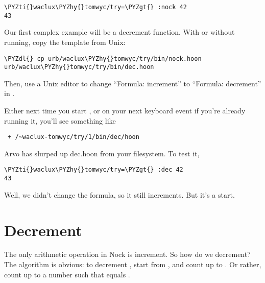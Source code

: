 \begin{framed_shaded}
\begin{Verbatim}[fontsize=\relsize{-2.5},fontseries=b,commandchars=\\\{\}]
\PYZti{}waclux\PYZhy{}tomwyc/try=\PYZgt{} :nock 42
43
\end{Verbatim}
\end{framed_shaded}

Our first complex example will be a decrement function.  With or
without  running, copy the template from Unix:

\begin{framed_shaded}
\begin{Verbatim}[fontsize=\relsize{-2.5},fontseries=b,commandchars=\\\{\}]
\PYZdl{} cp urb/waclux\PYZhy{}tomwyc/try/bin/nock.hoon urb/waclux\PYZhy{}tomwyc/try/bin/dec.hoon
\end{Verbatim}
\end{framed_shaded}

Then, use a Unix editor to change ``Formula: increment'' to
``Formula: decrement'' in .

Either next time you start , or on your next keyboard event
if you're already running it, you'll see something like

\begin{verbatim}
 + /~waclux-tomwyc/try/1/bin/dec/hoon
\end{verbatim}

Arvo has slurped up dec.hoon from your filesystem.  To test it,

\begin{framed_shaded}
\begin{Verbatim}[fontsize=\relsize{-2.5},fontseries=b,commandchars=\\\{\}]
\PYZti{}waclux\PYZhy{}tomwyc/try=\PYZgt{} :dec 42
43
\end{Verbatim}
\end{framed_shaded}

Well, we didn't change the formula, so it still increments.  But
it's a start.

\section{Decrement}

The only arithmetic operation in Nock is increment.  So how do we
decrement?  The algorithm is obvious: to decrement , start
from , and count up to .  Or rather, count up to a number
 such that  equals .

